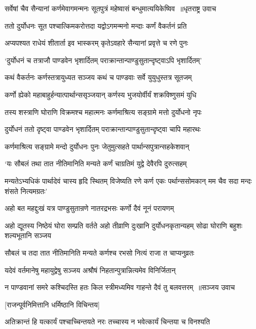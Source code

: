\threelineshloka
{सर्वेषां चैव सैन्यानां कर्णमेवागमन्मनः}
{सूतपुत्रं महेष्वासं बन्धुमात्ययिकेष्विव ॥धृतराष्ट्र उवाच}
{}


\twolineshloka
{ततो दुर्योधनः सूत पश्चात्किमकरोत्तदा}
{यद्वोऽगमन्मनो मन्दाः कर्णं वैकर्तनं प्रति}


\twolineshloka
{अप्यपश्यत राधेयं शीतार्ता इव भास्करम्}
{कृतेऽवहारे सैन्यानां प्रवृत्ते च रणे पुनः}


\twolineshloka
{`दुर्योधनं च तत्राजौ पाण्डवेन भृशार्दितम्}
{पराक्रान्तान्पाण्डुसुतान्दृष्ट्वाऽपि भृशार्दितम्'}


\twolineshloka
{कथं वैकर्तनः कर्णस्तत्रायुध्यत सञ्जय}
{कथं च पाण्डवाः सर्वे युयुधुस्तत्र सूतजम्}


\twolineshloka
{कर्णो ह्येको महाबाहुर्हन्यात्पार्थान्ससृञ्जयान्}
{कर्णस्य भुजयोर्वीर्यं शक्रविष्णुसमं युधि}


\twolineshloka
{तस्य शस्त्राणि घोराणि विक्रमश्च महात्मनः}
{कर्णमाश्रित्य सङ्ग्रामे मत्तो दुर्योधनो नृपः}


\twolineshloka
{दुर्योधनं ततो दृष्ट्वा पाण्डवेन भृशार्दितम्}
{पराक्रान्तान्पाण्डुसुतान्दृष्ट्वा चापि महारथः}


\twolineshloka
{कर्णमाश्रित्य सङ्ग्रामे मन्दो दुर्योधनः पुनः}
{जेतुमुत्सहते पार्थान्सपुत्रान्सहकेशवान्}


\twolineshloka
{`यः सौबलं तथा तात नीतिमानिति मन्यते}
{कर्णं चाग्रतिमं युद्वे देवैरपि दुरुत्सहम्}


\threelineshloka
{मन्यतेऽभ्यधिकं पार्थादेवं चास्य हृदि स्थितम्}
{विजेष्यति रणे कर्ण एकः पर्थान्ससोमकान्}
{मम चैव सदा मन्दः शंसते नित्यमग्रतः'}


\twolineshloka
{अहो बत महद्दुःखं यत्र पाण्डुसुतान्रणे}
{नातरद्रभसः कर्णो दैवं नूनं परायणम्}


अहो द्यूतस्य निष्ठेयं घोरा सम्प्रति वर्तते
\twolineshloka
{अहो तीव्राणि दुःखानि दुर्योधनकृतान्यहम्}
{सोढा घोराणि बहुशः शल्यभूतानि सञ्जय}


\twolineshloka
{सौबलं च तदा तात नीतिमानिति मन्यते}
{कर्णश्च रभसो नित्यं राजा त चाप्यनुव्रतः}


\twolineshloka
{यदेवं वर्तमानेषु महायुद्वेषु सञ्जय}
{अश्रौषं निहतान्पुत्रान्नित्यमेव विनिर्जितान्}


\threelineshloka
{न पाण्डवानां समरे कश्चिदस्ति हतः किल}
{स्त्रीमध्यमिव गाहन्ते दैवं तु बलवत्तरम् ॥सञ्जय उवाच}
{}


\twolineshloka
{[राजन्पूर्वनिमित्तानि धर्मिष्ठानि विचिन्तय]}
{}


\twolineshloka
{अतिक्रान्तं हि यत्कार्यं पश्चाच्चिन्तयते नरः}
{तच्चास्य न भवेत्कार्यं चिन्तया च विनश्यति}


